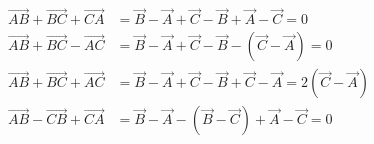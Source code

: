 \begin{align}
	\overrightarrow{AB}+\overrightarrow{BC}+\overrightarrow{CA} &=
\vec{B}-\vec{A} + \vec{C} - \vec{B} + \vec{A} - \vec{C}
= 0
\\
	\overrightarrow{AB}+\overrightarrow{BC}-\overrightarrow{AC} &=
\vec{B}-\vec{A} + \vec{C} - \vec{B} - (\vec{C} - \vec{A})
= 0
\\
	\overrightarrow{AB}+\overrightarrow{BC}+\overrightarrow{AC} &=
\vec{B}-\vec{A} + \vec{C} - \vec{B} + \vec{C} - \vec{A}
= 2(\vec{C}-\vec{A})
\\
	\overrightarrow{AB}-\overrightarrow{CB}+\overrightarrow{CA} &=
\vec{B}-\vec{A} - (\vec{B} - \vec{C}) + \vec{A} - \vec{C}
= 0
\end{align}
